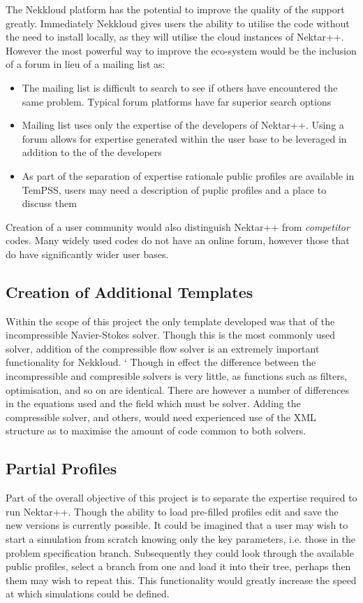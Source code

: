 \documentclass[11pt, a4paper]{report}
\begin{document}
The Nekkloud platform has the potential to improve the quality of the support greatly. Immediately Nekkloud gives users the ability to utilise the code without the need to install locally, as they will utilise the cloud instances of Nektar++. However the most powerful way to improve the eco-system would be the inclusion of a forum in lieu of a mailing list as:
\begin{itemize}
\item The mailing list is difficult to search to see if others have encountered the same problem. Typical forum platforms have far superior search options
\item Mailing list uses only the expertise of the developers of Nektar++. Using a forum allows for expertise generated within the user base to be leveraged in addition to the of the developers
\item As part of the separation of expertise rationale public profiles are available in TemPSS, users may need a description of puplic profiles and a place to discuss them
\end{itemize}

Creation of a user community would also distinguish Nektar++ from \textit{competitor} codes. Many widely used codes do not have an online forum, however those that do have significantly wider user bases.

\subsection{Creation of Additional Templates}
Within the scope of this project the only template developed was that of the incompressible Navier-Stokes solver. Though this is the most commonly used solver, addition of the compressible flow solver is an extremely important functionality for Nekkloud.
`
Though in effect the difference between the incompressible and compresible solvers is very little, as functions such as filters, optimisation, and so on are identical. There are however a number of differences in the equations used and the field which must be solver. Adding the compressible solver, and others, would need experienced use of the XML structure as to maximise the amount of code common to both solvers.

\subsection{Partial Profiles}
Part of the overall objective of this project is to separate the expertise required to run Nektar++. Though the ability to load pre-filled profiles edit and save the new versions is currently possible. It could be imagined that a user may wish to start a simulation from scratch knowing only the key parameters, i.e. those in the problem specification branch. Subsequently they could look through the available public profiles, select a branch from one and load it into their tree, perhaps then them may wish to repeat this. This functionality would greatly increase the speed at which simulations could be defined.
\end{document}
